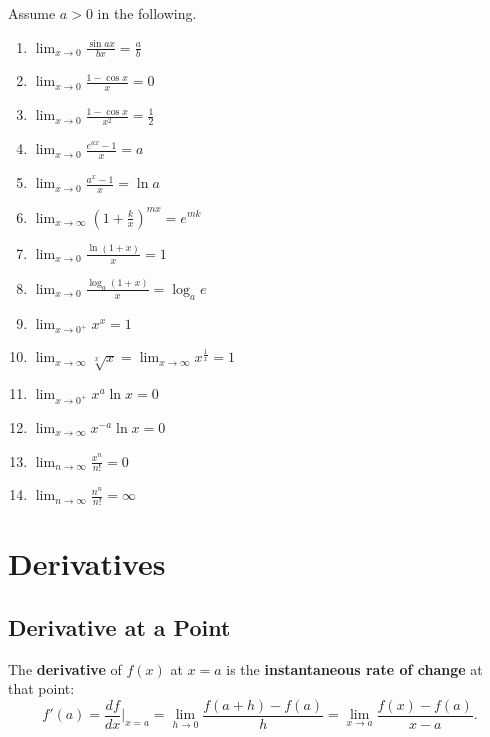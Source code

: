 \documentclass[a4paper,11pt]{article}
\begin{document}
\begin{tcolorbox}
    Assume $a > 0$ in the following.
    \begin{multicols}{2}
        \begin{enumerate}
            \item $\lim_{x \to 0} \frac{\sin{ax}}{bx} = \frac{a}{b}$
            \item $\lim_{x \to 0} \frac{1 - \cos{x}}{x} = 0$
            \item $\lim_{x \to 0} \frac{1 - \cos{x}}{x^2} = \frac{1}{2}$
            \item $\lim_{x \to 0} \frac{e^{ax} - 1}{x} = a$
            \item $\lim_{x \to 0} \frac{a^x - 1}{x} = \ln a$
            \item $\lim_{x \to \infty} \left(1 + \frac{k}{x}\right)^{mx} = e^{mk}$
            \item $\lim_{x \to 0} \frac{\ln{(1 + x)}}{x} = 1$
            \item $\lim_{x \to 0} \frac{\log_a{(1 + x)}}{x} = \log_a{e}$
            \item $\lim_{x \to 0^+} x^x = 1$
            \item $\lim_{x \to \infty} \sqrt[x]{x} = \lim_{x \to \infty} x^{\frac{1}{x}} = 1$
            \item $\lim_{x \to 0^+} x^a \ln{x} = 0$
            \item $\lim_{x \to \infty} x^{-a} \ln{x} = 0$
            \item $\lim_{n \to \infty} \frac{x^n}{n!} = 0$
            \item $\lim_{n \to \infty} \frac{n^n}{n!} = \infty$
        \end{enumerate}
    \end{multicols}
\end{tcolorbox}




\section{Derivatives}




\subsection{Derivative at a Point}

\begin{tcolorbox}
    The \textbf{derivative} of $f(x)$ at $x = a$ is the \textbf{instantaneous rate of change} at that point:
    \[
    f'(a) = \frac{df}{dx} \bigg|_{x=a} =\lim_{h \to 0} \frac{f(a + h) - f(a)}{h} = \lim_{x \to a} \frac{f(x) - f(a)}{x - a}.
    \]
\end{tcolorbox}
\end{document}
